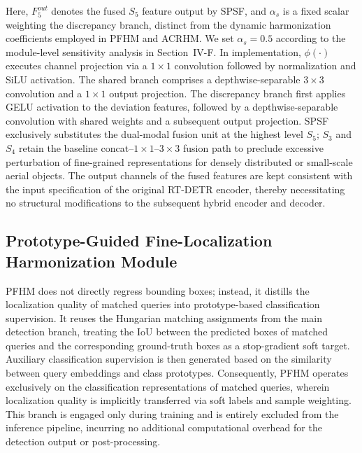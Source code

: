 \documentclass[letterpaper,journal]{IEEEtran}
\begin{document}
Here, $F_5^{out}$ denotes the fused $S_5$ feature output by SPSF, and $\alpha_s$ is a fixed scalar weighting the discrepancy branch, distinct from the dynamic harmonization coefficients employed in PFHM and ACRHM. We set $\alpha_s=0.5$ according to the module-level sensitivity analysis in Section~IV-F. In implementation, $\phi(\cdot)$ executes channel projection via a $1\times1$ convolution followed by normalization and SiLU activation. The shared branch comprises a depthwise-separable $3\times3$ convolution and a $1\times1$ output projection. The discrepancy branch first applies GELU activation to the deviation features, followed by a depthwise-separable convolution with shared weights and a subsequent output projection. SPSF exclusively substitutes the dual-modal fusion unit at the highest level $S_5$; $S_3$ and $S_4$ retain the baseline concat--$1\times1$--$3\times3$ fusion path to preclude excessive perturbation of fine-grained representations for densely distributed or small-scale aerial objects. The output channels of the fused features are kept consistent with the input specification of the original RT-DETR encoder, thereby necessitating no structural modifications to the subsequent hybrid encoder and decoder.

\subsection{Prototype-Guided Fine-Localization Harmonization Module}
\label{sec:pfhm}
PFHM does not directly regress bounding boxes; instead, it distills the localization quality of matched queries into prototype-based classification supervision. It reuses the Hungarian matching assignments from the main detection branch, treating the IoU between the predicted boxes of matched queries and the corresponding ground-truth boxes as a stop-gradient soft target. Auxiliary classification supervision is then generated based on the similarity between query embeddings and class prototypes. Consequently, PFHM operates exclusively on the classification representations of matched queries, wherein localization quality is implicitly transferred via soft labels and sample weighting. This branch is engaged only during training and is entirely excluded from the inference pipeline, incurring no additional computational overhead for the detection output or post-processing.
\end{document}
